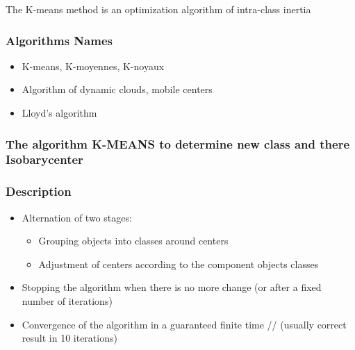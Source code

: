 \documentclass[12pt]{report}
\begin{document}
The K-means method is an optimization algorithm of intra-class inertia \par

\subsubsection*{Algorithms Names}
\begin{itemize}
\item K-means, K-moyennes, K-noyaux
\item Algorithm of dynamic clouds, mobile centers
\item Lloyd’s algorithm
\end{itemize}

\subsubsection*{The algorithm K-MEANS to determine new class and there Isobarycenter}

\subsubsection*{Description}

\begin{itemize}
\item Alternation of two stages:

\begin{itemize}
\item Grouping objects into classes around centers
\item Adjustment of centers according to the component objects classes
\end{itemize}

\item Stopping the algorithm when there is no more change (or after a fixed number of iterations)
\item Convergence of the algorithm in a guaranteed finite time //
(usually correct result in 10 iterations)

\end{itemize}
\end{document}

